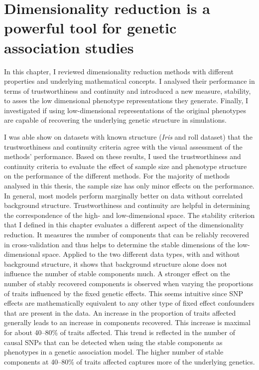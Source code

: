 \section{Dimensionality reduction is a powerful tool for genetic association studies}
In this chapter, I reviewed dimensionality reduction methods with different properties and underlying mathematical concepts. I analysed their performance in terms of trustworthiness and continuity and introduced a new measure, stability, to asses the low dimensional phenotype representations they generate. Finally, I investigated if using low-dimensional representations of the original phenotypes are capable of recovering the underlying genetic structure in simulations.

I was able show on datasets with known structure (\textit{Iris} and roll dataset) that the trustworthiness and continuity criteria agree with the visual assessment of the methods' performance. Based on these results, I used the trustworthiness and continuity criteria to evaluate the effect of sample size and phenotype structure on the performance of the different methods. For the majority of methods analysed in this thesis, the sample size has only minor effects on the performance. In general, most models perform marginally better on data without correlated background structure. Trustworthiness and continuity are helpful in determining the correspondence of the high- and low-dimensional space. The stability criterion that I defined in this chapter evaluates a different aspect of the dimensionality reduction. It measures the number of components that can be reliably recovered in cross-validation and thus helps to determine the stable dimensions of the low-dimensional space. Applied to the two different data types, with and without background structure, it shows that background structure alone does not influence the number of stable components much. A stronger effect on the number of stably recovered components is observed when varying the proportions of traits influenced by the fixed genetic effects. This seems intuitive since SNP effects are mathematically equivalent to any other type of fixed effect confounders that are present in the data. An increase in the proportion of traits affected generally leads to an increase in components recovered. This increase is maximal for about \numrange{40}{80}\% of traits affected. This trend is reflected in the number of causal SNPs that can be detected when using the stable components as phenotypes in a genetic association model. The higher number of stable components at \numrange{40}{80}\% of traits affected captures more of the underlying genetics. 

